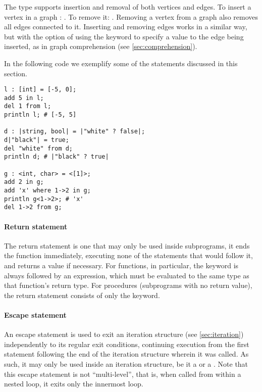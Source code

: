The  type supports insertion and removal of both vertices and edges. To insert a vertex  in a graph :    . To remove it:    . Removing a vertex from a graph also removes all edges connected to it. Inserting and removing edges works in a similar way, but with the option of using the  keyword to specify a value to the edge being inserted, as in graph comprehension (see \autoref{sec:comprehension}).

In the following code we exemplify some of the statements discussed in this section.
\begin{lstlisting}[language=Gryph]
l : [int] = [-5, 0];
add 5 in l;
del 1 from l;
println l; # [-5, 5]

d : |string, bool| = |"white" ? false|;
d|"black"| = true;
del "white" from d;
println d; # |"black" ? true|

g : <int, char> = <[1]>;
add 2 in g;
add 'x' where 1->2 in g;
println g<1->2>; # 'x'
del 1->2 from g;
\end{lstlisting}

\paragraph{Return statement}
\label{sec:return}
The return statement is one that may only be used inside subprograms, it ends the function immediately, executing none of the statements that would follow it, and returns a value if necessary. For functions, in particular, the  keyword is always followed by an expression, which must be evaluated to the same type as that function's return type. For procedures (subprograms with no return value), the return statement consists of only the  keyword.

\paragraph{Escape statement}
\label{sec:escape}
An escape statement is used to exit an iteration structure (see \autoref{sec:iteration}) independently to its regular exit conditions, continuing execution from the first statement following the end of the iteration structure wherein it was called. As such, it may only be used inside an iteration structure, be it a  or a . Note that this escape statement is not ``multi-level'', that is, when called from within a nested loop, it exits only the innermost loop.

